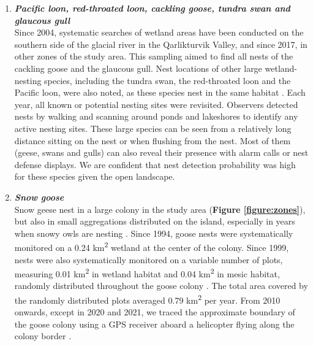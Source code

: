 \documentclass[a4paper,twoside,10pt]{article}
\begin{document}
	\begin{enumerate}[label=\roman*]
	\item[] \textit{\textbf{Pacific loon, red-throated loon, cackling goose, tundra swan and glaucous gull}}\\
	Since 2004, systematic searches of wetland areas have been conducted on the southern side of the glacial river in the Qarlikturvik Valley, and since 2017, in other zones of the study area. This sampling aimed to find all nests of the cackling goose and the glaucous gull. Nest locations of other large wetland-nesting species, including the tundra swan, the red-throated loon and the Pacific loon, were also noted, as these species nest in the same habitat \citep{duchesne2021,gauthier2024a}. Each year, all known or potential nesting sites were revisited. Observers detected nests by walking and scanning around ponds and lakeshores to identify any active nesting sites. These large species can be seen from a relatively long distance sitting on the nest or when flushing from the nest. Most of them (geese, swans and gulls) can also reveal their presence with alarm calls or nest defense displays. We are confident that nest detection probability was high for these species given the open landscape.\\
	
	\item[] \textit{\textbf{Snow goose}}\\
	Snow geese nest in a large colony in the study area (\textbf{Figure \ref{figure:zones}}), but also in small aggregations distributed on the island, especially in years when snowy owls are nesting \citep{lepage1996,reed2002}. Since 1994, goose nests were systematically monitored on a 0.24 km\textsuperscript{2} wetland at the center of the colony. Since 1999, nests were also systematically monitored on a variable number of plots, measuring 0.01 km\textsuperscript{2} in wetland habitat and 0.04 km\textsuperscript{2} in mesic habitat, randomly distributed throughout the goose colony \citep{gauthier2020goose}. The total area covered by the randomly distributed plots averaged 0.79  km\textsuperscript{2} per year. From 2010 onwards, except in 2020 and 2021, we traced the approximate boundary of the goose colony using a GPS receiver aboard a helicopter flying along the colony border \citep{duchesne2021}.
	

\end{enumerate}
\end{document}
